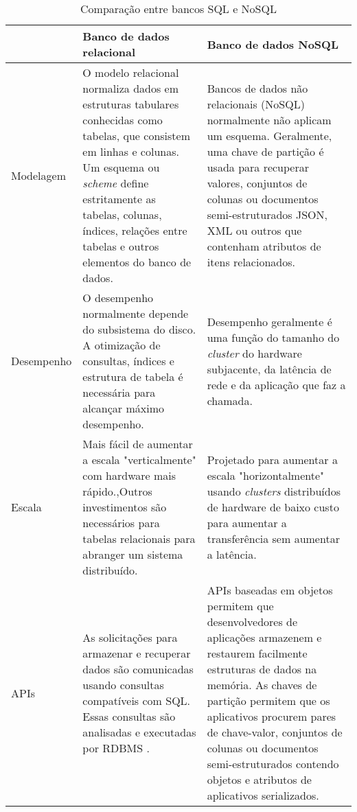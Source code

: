 \begin{table}[H]
	\label{tabela-sql-nosql}
	\begin{tabular}{|m{2.5cm}|m{6cm}|m{6cm}|}
		 \hline	
		& Banco de dados relacional                                                                                                                                                                                                                            & Banco de dados NoSQL                                                                                                                                                                                                                                                                                                                \\ \hline 
		Modelagem   & O modelo relacional normaliza dados em estruturas tabulares conhecidas como tabelas, que consistem em linhas e colunas. Um esquema ou \textit{scheme} define estritamente as tabelas, colunas, índices, relações entre tabelas e outros elementos do banco de dados.     & Bancos de dados não relacionais (NoSQL) normalmente não aplicam um esquema. Geralmente, uma chave de partição é usada para recuperar valores, conjuntos de colunas ou documentos semi-estruturados JSON, XML ou outros que contenham atributos de itens relacionados.                                                                  \\ \hline 
		Desempenho  & O desempenho normalmente depende do subsistema do disco. A otimização de consultas, índices e estrutura de tabela é necessária para alcançar máximo desempenho.                                                                                      & Desempenho geralmente é uma função do tamanho do \textit{cluster} do hardware subjacente, da latência de rede e da aplicação que faz a chamada.  \\ \hline 
		Escala      & Mais fácil de aumentar a escala "verticalmente" com hardware mais rápido.,Outros investimentos são necessários para tabelas relacionais para abranger um sistema distribuído.                                                                        & Projetado para aumentar a escala "horizontalmente" usando \textit{clusters} distribuídos de hardware de baixo custo para aumentar a transferência sem aumentar a latência.                                \\ \hline 
		APIs & As solicitações para armazenar e recuperar dados são comunicadas usando consultas compatíveis com SQL. Essas consultas são analisadas e executadas por \ac{RDBMS} . & APIs baseadas em objetos permitem que desenvolvedores de aplicações armazenem e restaurem facilmente estruturas de dados na memória. As chaves de partição permitem que os aplicativos procurem pares de chave-valor, conjuntos de colunas ou documentos semi-estruturados contendo objetos e atributos de aplicativos serializados. \\ \hline 
	\end{tabular}
		\caption{Comparação entre bancos SQL e NoSQL}
\end{table}


